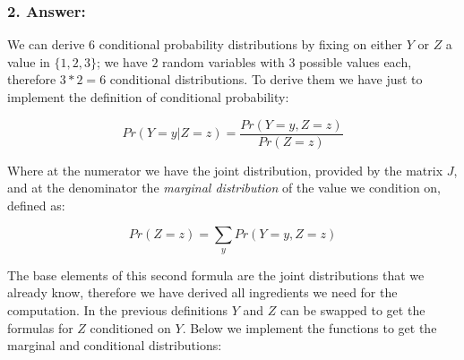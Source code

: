 \documentclass[
]{article}
\begin{document}
\hypertarget{answer-1}{%
\subsubsection{2. Answer:}\label{answer-1}}

We can derive \(6\) conditional probability distributions by fixing on
either \(Y\) or \(Z\) a value in \(\{1,2,3\}\); we have \(2\) random
variables with \(3\) possible values each, therefore \(3*2=6\)
conditional distributions. To derive them we have just to implement the
definition of conditional probability:

\[
Pr(Y = y | Z = z) = \frac{Pr(Y = y, Z = z)}{Pr(Z = z)}
\]

Where at the numerator we have the joint distribution, provided by the
matrix \(J\), and at the denominator the \emph{marginal distribution} of
the value we condition on, defined as:

\[
Pr(Z = z) = \sum_yPr(Y = y, Z = z)
\]

The base elements of this second formula are the joint distributions
that we already know, therefore we have derived all ingredients we need
for the computation. In the previous definitions \(Y\) and \(Z\) can be
swapped to get the formulas for \(Z\) conditioned on \(Y\). Below we
implement the functions to get the marginal and conditional
distributions:
\end{document}
